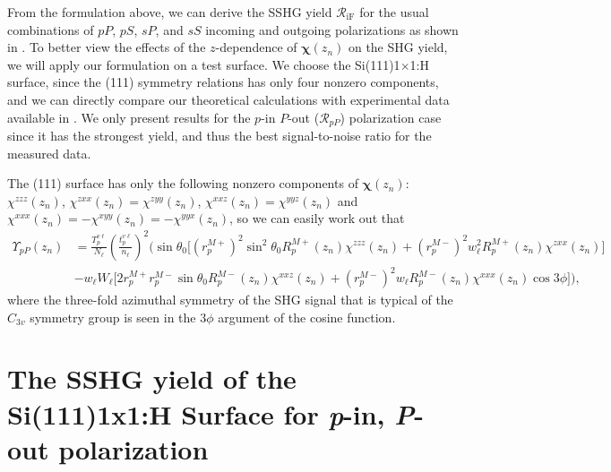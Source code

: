 \documentclass[utf8]{frontiersSCNS}
\begin{document}
From the formulation above, we can derive the SSHG yield
$\mathcal{R}_{\mathrm{iF}}$ for the usual combinations of $pP$, $pS$, $sP$, and
$sS$ incoming and outgoing polarizations as shown in \cite{andersonPRB16b}. To
better view the effects of the $z$-dependence of $\boldsymbol{\chi}(z_{n})$ on
the SHG yield, we will apply our formulation on a test surface. We choose the
Si(111)1$\times$1:H surface, since the (111) symmetry relations has only four
nonzero components, and we can directly compare our theoretical calculations
with experimental data available in \cite{mejiaPRB02}. We only present results
for the $p$-in $P$-out ($\mathcal{R}_{pP}$) polarization case since it has the
strongest yield, and thus the best signal-to-noise ratio for the measured data.

The (111) surface has only the following nonzero components of
$\boldsymbol{\chi}(z_{n})$: $\chi^{zzz}(z_{n})$, $\chi^{zxx}(z_{n}) =
\chi^{zyy}(z_{n })$, $\chi^{xxz}(z_{n}) = \chi^{yyz}(z_{n})$ and
$\chi^{xxx}(z_{n}) = -\chi^{xyy}(z_{n}) = -\chi^{yyx}(z_{n})$, so we can easily
work out that
\begin{equation}\label{eq:rpp111}
\begin{split}
\Upsilon_{pP}(z_{n}) &=
\frac{T^{v\ell}_{p}}{N_{\ell}}
\left(\frac{t^{v\ell}_{p}}{n_{\ell}}\right)^{2}
\Bigg(
\sin\theta_{0}
\Big[
  \left(r^{M+}_{p}\right)^{2}\sin^{2}\theta_{0}R^{M+}_{p}(z_{n})
\chi^{zzz}(z_{n})
+ \left(r^{M-}_{p}\right)^{2}w^{2}_{\ell}R^{M+}_{p}(z_{n})\chi^{zxx}(z_{n})
\Big]\\
&- 
w_{\ell}W_{\ell}
\Big[
  2r^{M+}_{p}r^{M-}_{p}\sin\theta_{0}R^{M-}_{p}(z_{n})\chi^{xxz}(z_{n})
+ \left(r^{M-}_{p}\right)^{2}w_{\ell}R^{M-}_{p}(z_{n})\chi^{xxx}(z_{n})\cos3\phi 
\Big]\Bigg),
\end{split}
\end{equation}
where the three-fold azimuthal symmetry of the SHG signal that is typical of the
$C_{3v}$ symmetry group is seen in the $3\phi$ argument of the cosine function.


\section{The SSHG yield of the Si(111)1\texorpdfstring{\lowercase{x}}{x}1:H
Surface for \emph{p}-in, \emph{P}-out polarization}\label{res}
\end{document}
